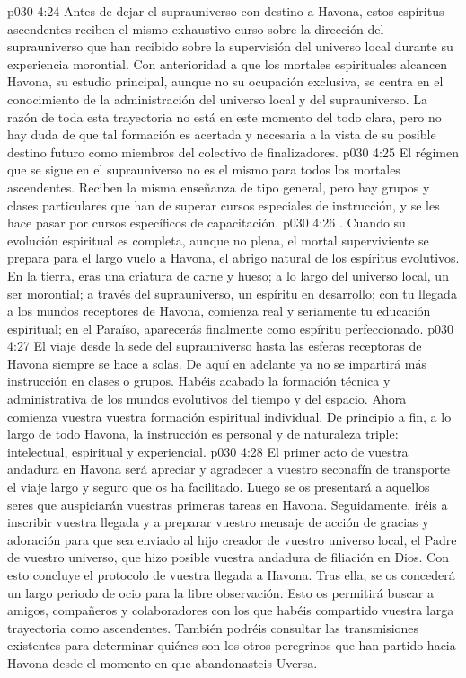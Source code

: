 \vs p030 4:24 Antes de dejar el suprauniverso con destino a Havona, estos espíritus ascendentes reciben el mismo exhaustivo curso sobre la dirección del suprauniverso que han recibido sobre la supervisión del universo local durante su experiencia morontial. Con anterioridad a que los mortales espirituales alcancen Havona, su estudio principal, aunque no su ocupación exclusiva, se centra en el conocimiento de la administración del universo local y del suprauniverso. La razón de toda esta trayectoria no está en este momento del todo clara, pero no hay duda de que tal formación es acertada y necesaria a la vista de su posible destino futuro como miembros del colectivo de finalizadores.
\vs p030 4:25 El régimen que se sigue en el suprauniverso no es el mismo para todos los mortales ascendentes. Reciben la misma enseñanza de tipo general, pero hay grupos y clases particulares que han de superar cursos especiales de instrucción, y se les hace pasar por cursos específicos de capacitación.
\vs p030 4:26 . Cuando su evolución espiritual es completa, aunque no plena, el mortal superviviente se prepara para el largo vuelo a Havona, el abrigo natural de los espíritus evolutivos. En la tierra, eras una criatura de carne y hueso; a lo largo del universo local, un ser morontial; a través del suprauniverso, un espíritu en desarrollo; con tu llegada a los mundos receptores de Havona, comienza real y seriamente tu educación espiritual; en el Paraíso, aparecerás finalmente como espíritu perfeccionado.
\vs p030 4:27 El viaje desde la sede del suprauniverso hasta las esferas receptoras de Havona siempre se hace a solas. De aquí en adelante ya no se impartirá más instrucción en clases o grupos. Habéis acabado la formación técnica y administrativa de los mundos evolutivos del tiempo y del espacio. Ahora comienza vuestra  vuestra formación espiritual individual. De principio a fin, a lo largo de todo Havona, la instrucción es personal y de naturaleza triple: intelectual, espiritual y experiencial.
\vs p030 4:28 El primer acto de vuestra andadura en Havona será apreciar y agradecer a vuestro seconafín de transporte el viaje largo y seguro que os ha facilitado. Luego se os presentará a aquellos seres que auspiciarán vuestras primeras tareas en Havona. Seguidamente, iréis a inscribir vuestra llegada y a preparar vuestro mensaje de acción de gracias y adoración para que sea enviado al hijo creador de vuestro universo local, el Padre de vuestro universo, que hizo posible vuestra andadura de filiación en Dios. Con esto concluye el protocolo de vuestra llegada a Havona. Tras ella, se os concederá un largo periodo de ocio para la libre observación. Esto os permitirá buscar a amigos, compañeros y colaboradores con los que habéis compartido vuestra larga trayectoria como ascendentes. También podréis consultar las transmisiones existentes para determinar quiénes son los otros peregrinos que han partido hacia Havona desde el momento en que abandonasteis Uversa.
